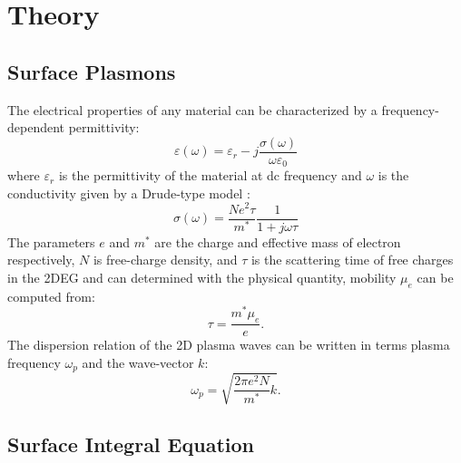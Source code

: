 \documentclass[conference, 10pt]{IEEEtran}
\renewcommand{\O}{\omega}  %
\newcommand{\E}{\varepsilon}  %
\renewcommand{\^}{\hat}  %
\begin{document}
\section{Theory}

\subsection{Surface Plasmons}
%
The electrical properties of any material can be characterized by a frequency-dependent permittivity:
%
\begin{equation}
  \E(\O)=\E_r - j\frac{\sigma(\O)}{\omega \E_0}
  \label{eq:epsilon}
\end{equation}
%
where $\E_r$ is the permittivity of the material at dc frequency and $\O$ is the conductivity given by a Drude-type model \cite{burke2000high}:
%
\begin{equation}
  \sigma(\O) = \frac{N e^2 \tau}{m^{\ast}}\frac{1}{1 + j \O \tau}
  \label{eq:conductivity}
\end{equation}
%
The parameters $e$ and $m^*$ are the charge and effective mass of electron respectively, $N$ is free-charge density, and $\tau$ is the scattering time of free charges in the 2DEG and can determined with the physical quantity, mobility $\mu_e$ can be computed from:
\begin{equation}
  \tau  = \frac{m^{\ast} \mu_e}{e}.
  \label{eq:tau}
\end{equation}
%
The dispersion relation of the 2D plasma waves can be written in terms plasma frequency $\O_p$ and the wave-vector $k$:
%
\begin{equation}
  \O_{p} =  \sqrt{\frac{2 \pi e^2 N} {m^{\ast}} k}.
  \label{eq:N_2d}
\end{equation}
%
\subsection{Surface Integral Equation}
\end{document}
